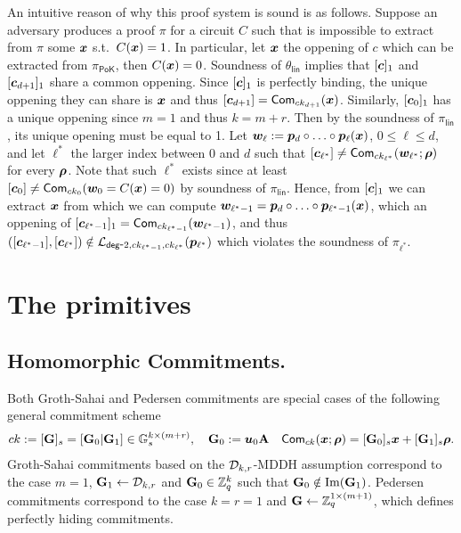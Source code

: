 An intuitive reason of why this proof system is sound is as follows. Suppose an adversary produces a proof $\pi$ for a circuit $C$ such that is impossible to extract from $\pi$ some ${\boldsymbol{x}}$ s.t.~$C({\boldsymbol{x}})=1$. In particular, let ${\boldsymbol{x}}$ the oppening of $c$ which can be extracted from $\pi_\mathsf{PoK}$, then $C({\boldsymbol{x}})=0$. Soundness of $\theta_\mathsf{lin}$ implies that $[{\boldsymbol{c}}]_1$ and $[{\boldsymbol{c}}_{d+1}]_1$ share a common oppening. Since $[{\boldsymbol{c}}]_1$ is perfectly binding, the unique oppening they can share is ${\boldsymbol{x}}$ and thus $[{\boldsymbol{c}}_{d+1}]=\mathsf{Com}_{ck_{d+1}}({\boldsymbol{x}})$. Similarly, $[{\boldsymbol{c}}_0]_1$ has a unique oppening since $m=1$ and thus $k=m+r$. Then by the soundness of $\pi_\mathsf{lin}$, its unique opening must be equal to 1.
Let ${\boldsymbol{w}}_\ell := {\boldsymbol{p}}_d\circ\ldots\circ {\boldsymbol{p}}_\ell({\boldsymbol{x}})$, $0\leq\ell\leq d$, and let $\ell^*$ the larger index between $0$ and $d$ such that $[{\boldsymbol{c}}_{\ell^*}]\neq\mathsf{Com}_{ck_{\ell^*}}({\boldsymbol{w}}_{\ell^*};{\boldsymbol{\rho}})$ for every ${\boldsymbol{\rho}}$. Note that such $\ell^*$ exists since at least $[{\boldsymbol{c}}_0]\neq\mathsf{Com}_{ck_0}({\boldsymbol{w}}_0 = C({\boldsymbol{x}})=0)$ by soundness of $\pi_\mathsf{lin}$. Hence, from $[{\boldsymbol{c}}]_1$ we can extract ${\boldsymbol{x}}$ from which we can compute ${\boldsymbol{w}}_{\ell^*-1} = {\boldsymbol{p}}_d\circ\ldots\circ {\boldsymbol{p}}_{\ell^*-1}({\boldsymbol{x}})$, which an oppening of $[{\boldsymbol{c}}_{\ell^*-1}]_1=\mathsf{Com}_{ck_{\ell^*-1}}({\boldsymbol{w}}_{\ell^*-1})$, and thus $([{\boldsymbol{c}}_{\ell^*-1}],[{\boldsymbol{c}}_{\ell^*}])\notin\mathcal{L}_{\mathsf{deg}\mbox{-}2,ck_{\ell^*-1},ck_{\ell^*}}({\boldsymbol{p}}_{\ell^*})$ which violates the soundness of $\pi_{\ell^*}$.

\section{The primitives}

\subsection{Homomorphic Commitments.}
Both Groth-Sahai and Pedersen commitments are special cases of the following general commitment scheme
\begin{align*}
&ck:=[\mathbf{{G}}]_s=[\mathbf{{G}}_0|\mathbf{{G}}_1]\in\mathbb{G}_s^{k\times (m+r)}, \quad \mathbf{{G}}_0 :={\boldsymbol{u}}_0\mathbf{{A}}
& \mathsf{Com}_{ck}({\boldsymbol{x}};{\boldsymbol{\rho}})=[\mathbf{{G}}_0]_s{\boldsymbol{x}}+[\mathbf{{G}}_1]_s{\boldsymbol{\rho}}.
\end{align*}
Groth-Sahai commitments based on the $\mathcal{D}_{k,r}$-MDDH assumption correspond to the case $m=1$, $\mathbf{{G}}_1\gets\mathcal{D}_{k,r}$ and $\mathbf{{G}}_0\in\mathbb{Z}_q^k$ such that $\mathbf{{G}}_0\notin\mathrm{Im}(\mathbf{{G}}_1)$. Pedersen commitments correspond to the case $k=r=1$ and $\mathbf{{G}}\gets\mathbb{Z}_q^{1\times(m+1)}$, which defines perfectly hiding commitments.


